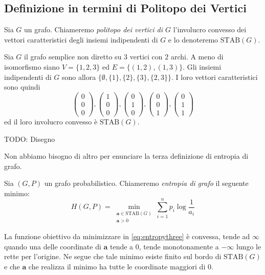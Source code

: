 \subsection{Definizione in termini di Politopo dei Vertici} 
\begin{definition}
	Sia \(G\) un grafo. Chiameremo \emph{politopo dei vertici di \(G\)} l'involucro convesso dei vettori caratteristici degli insiemi indipendenti di \(G\) e lo denoteremo \(\text{STAB}(G)\). 
\end{definition}
\begin{example}
	Sia \(G\) il grafo semplice non diretto su \(3\) vertici con \(2\) archi. A meno di isomorfismo siano \(V=\{1,2,3\}\) ed \(E=\{(1,2),(1,3)\}\). Gli insiemi indipendenti di \(G\) sono allora \(\{\emptyset , \{1\}, \{2\}, \{3\}, \{2,3\}\}\). I loro vettori caratteristici sono quindi
	\[ 
	\begin{pmatrix}
		0\\0\\0 
	\end{pmatrix}
	, 
	\begin{pmatrix}
		1\\0\\0 
	\end{pmatrix}
	, 
	\begin{pmatrix}
		0\\1\\0 
	\end{pmatrix}
	, 
	\begin{pmatrix}
		0\\0\\1 
	\end{pmatrix}
	, 
	\begin{pmatrix}
		0\\1\\1 
	\end{pmatrix}
	\]
	ed il loro involucro convesso è \(\text{STAB}(G)\).
	
  TODO: Disegno 
\end{example}

Non abbiamo bisogno di altro per enunciare la terza definizione di entropia di grafo. 
\begin{definition}
	Sia \((G,P)\) un grafo probabilistico. Chiameremo \emph{entropia di grafo} il seguente minimo: 
	\begin{equation}
		\label{eq:entropythree} H(G,P)=\min_{\substack{\mathbf{a}\in \text{STAB}(G) \\
		\mathbf{a} > 0}} \sum_{i=1}^n p_i \log{\frac{1}{a_i}} 
	\end{equation}
\end{definition}
\begin{remark}
	La funzione obiettivo da minimizzare in \eqref{eq:entropythree} è convessa, tende ad \(\infty\) quando una delle coordinate di \(\mathbf{a}\) tende a \(0\), tende monotonamente a \(-\infty\) lungo le rette per l'origine. Ne segue che tale minimo esiste finito sul bordo di \(\text{STAB}(G)\) e che \(\mathbf{a}\) che realizza il minimo ha tutte le coordinate maggiori di \(0\). 
\end{remark}


